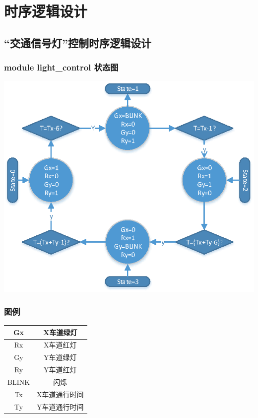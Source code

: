 \documentclass[12pt,a4paper]{article}
\begin{document}
	\section{时序逻辑设计}
	\subsection{“交通信号灯”控制时序逻辑设计}
		\subsubsection{module light\_control 状态图}
		\begin{center}
		\includegraphics[width=15cm]{pic/statemachine.eps}
		\end{center}
		
	\subsubsection{图例}	
	\begin{center}
			\begin{tabular}{|c|c|}
			\hline Gx & X车道绿灯 \\ 
			\hline Rx & X车道红灯 \\ 
			\hline Gy & Y车道绿灯 \\ 
			\hline Ry & Y车道红灯 \\ 
			\hline BLINK & 闪烁 \\ 
			\hline Tx & X车道通行时间 \\ 
			\hline Ty & Y车道通行时间 \\ 
			\hline 
		\end{tabular}
	\end{center} 
	
\end{document}
